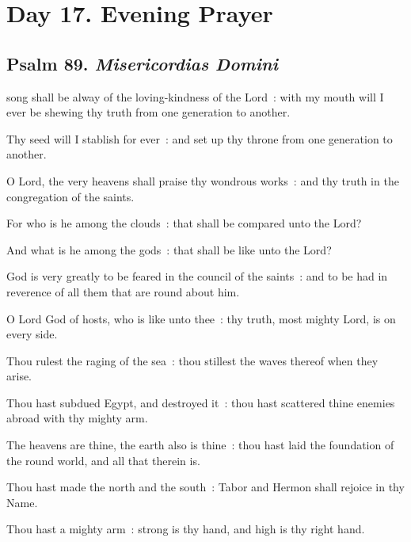 \section*{Day 17. Evening Prayer}

\subsection{Psalm 89. \textit{Misericordias Domini}}


 song shall be alway of the loving-kindness of the Lord~: with my mouth will I ever be shewing thy truth from one generation to another.\par
{}
Thy seed will I stablish for ever~: and set up thy throne from one generation to another.\par
{}O Lord, the very heavens shall praise thy wondrous works~: and thy truth in the congregation of the saints.\par
{}For who is he among the clouds~: that shall be compared unto the Lord?\par
{}And what is he among the gods~: that shall be like unto the Lord?\par
{}God is very greatly to be feared in the council of the saints~: and to be had in reverence of all them that are round about him.\par
{}O Lord God of hosts, who is like unto thee~: thy truth, most mighty Lord, is on every side.\par
{}Thou rulest the raging of the sea~: thou stillest the waves thereof when they arise.\par
{}Thou hast subdued Egypt, and destroyed it~: thou hast scattered thine enemies abroad with thy mighty arm.\par
{}The heavens are thine, the earth also is thine~: thou hast laid the foundation of the round world, and all that therein is.\par
{}Thou hast made the north and the south~: Tabor and Hermon shall rejoice in thy Name.\par
{}Thou hast a mighty arm~: strong is thy hand, and high is thy right hand.\par
